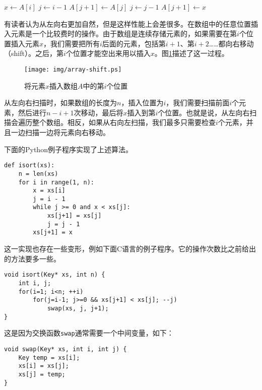 \documentclass{ctexart}
\begin{document}
\begin{algorithmic}[1]
    \State $x \gets A[i]$
    \State $j \gets i-1$
      \State $A[j+1] \gets A[j]$
      \State $j \gets j - 1$
    \EndWhile
    \State $A[j+1] \gets x$
  \EndFor
\EndFunction
\end{algorithmic}

有读者认为从左向右更加自然，但是这样性能上会差很多。在数组中的任意位置插入元素是一个比较费时的操作。由于数组是连续存储元素的，如果需要在第$i$个位置插入元素$x$，我们需要把所有$i$后面的元素，包括第$i+1$、第$i+2$……都向右移动（shift）。之后，第$i$个位置才能空出来用以插入$x$。图\ref{fig:array-shift}描述了这一过程。

\begin{figure}[htbp]
  \centering
  \texttt{[image: img/array-shift.ps]}
  \caption{将元素$x$插入数组$A$中的第$i$个位置}
  \label{fig:array-shift}
\end{figure}

从左向右扫描时，如果数组的长度为$n$，插入位置为$i$，我们需要扫描前面$i$个元素，然后进行$n-i+1$次移动，最后将$x$插入到第$i$个位置。也就是说，从左向右扫描会遍历整个数组。相反，如果从右向左扫描，我们最多只需要检查$i$个元素，并且一边扫描一边将元素向右移动。

下面的Python例子程序实现了上述算法。

\lstset{language=Python}
\begin{lstlisting}
def isort(xs):
    n = len(xs)
    for i in range(1, n):
        x = xs[i]
        j = i - 1
        while j >= 0 and x < xs[j]:
            xs[j+1] = xs[j]
            j = j - 1
        xs[j+1] = x
\end{lstlisting}

这一实现也存在一些变形，例如下面C语言的例子程序。它的操作次数比之前给出的方法要多一些。

\lstset{language=C}
\begin{lstlisting}
void isort(Key* xs, int n) {
    int i, j;
    for(i=1; i<n; ++i)
        for(j=i-1; j>=0 && xs[j+1] < xs[j]; --j)
            swap(xs, j, j+1);
}
\end{lstlisting}

这是因为交换函数\texttt{swap}通常需要一个中间变量，如下：

\begin{lstlisting}
void swap(Key* xs, int i, int j) {
    Key temp = xs[i];
    xs[i] = xs[j];
    xs[j] = temp;
}
\end{lstlisting}
\end{document}
